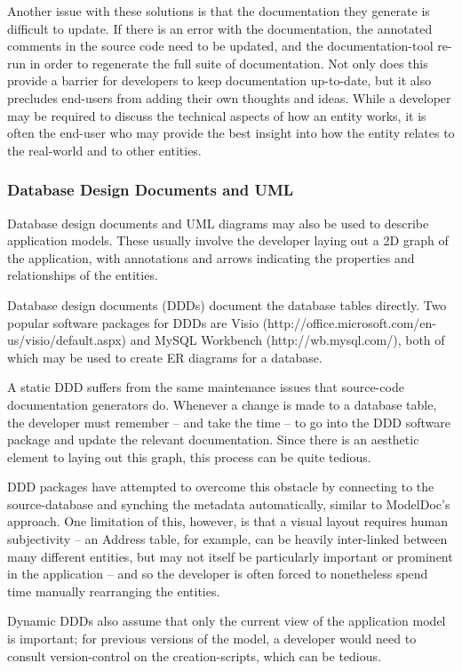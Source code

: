 \documentclass[twocolumn]{article}
\begin{document}
Another issue with these solutions is that the documentation they generate is
difficult to update.  If there is an error with the documentation, the
annotated comments in the source code need to be updated, and the
documentation-tool re-run in order to regenerate the full suite of
documentation.  Not only does this provide a barrier for developers to keep
documentation up-to-date, but it also precludes end-users from adding their own
thoughts and ideas.  While a developer may be required to discuss the technical
aspects of how an entity works, it is often the end-user who may provide the
best insight into how the entity relates to the real-world and to other
entities.

\subsubsection{Database Design Documents and UML}

Database design documents and UML diagrams may also be used to describe
application models.  These usually involve the developer laying out a 2D
graph of the application, with annotations and arrows indicating the
properties and relationships of the entities.

Database design documents (DDDs) document the database tables directly.  Two
popular software packages for DDDs are Visio
(http://office.microsoft.com/en-us/visio/default.aspx) and MySQL Workbench
(http://wb.mysql.com/), both of which may be used to create ER diagrams for a
database.

A static DDD suffers from the same maintenance issues that source-code
documentation generators do.  Whenever a change is made to a database table,
the developer must remember -- and take the time -- to go into the DDD software
package and update the relevant documentation.  Since there is an aesthetic
element to laying out this graph, this process can be quite tedious.

DDD packages have attempted to overcome this obstacle by connecting to the
source-database and synching the metadata automatically, similar to ModelDoc's
approach.  One limitation of this, however, is that a visual layout requires
human subjectivity -- an Address table, for example, can be heavily
inter-linked between many different entities, but may not itself be
particularly important or prominent in the application -- and so the
developer is often forced to nonetheless spend time manually rearranging the
entities.

Dynamic DDDs also assume that only the current view of the application model is
important; for previous versions of the model, a developer would need to
consult version-control on the creation-scripts, which can be tedious.
\end{document}
